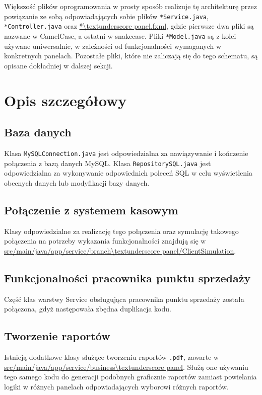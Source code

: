 \documentclass[a4paper,12pt]{article}
\begin{document}
Większość plików oprogramowania w prosty sposób realizuje tę architekturę przez powiązanie ze sobą odpowiadających sobie plików \texttt{*Service.java}, \texttt{*Controller.java} oraz \url{*\textunderscore panel.fxml}, gdzie pierwsze dwa pliki są nazwane w CamelCase, a ostatni w snake\textunderscore{}case.
Pliki \texttt{*Model.java} są z kolei używane uniwersalnie, w zależności od funkcjonalności wymaganych w konkretnych panelach.
Pozostałe pliki, które nie zaliczają się do tego schematu, są opisane dokładniej w dalszej sekcji.

\section{Opis szczegółowy}

\subsection{Baza danych}

Klasa \texttt{MySQLConnection.java} jest odpowiedzialna za nawiązywanie i kończenie połączenia z bazą danych MySQL.
Klasa \texttt{RepositorySQL.java} jest odpowiedzialna za wykonywanie odpowiednich poleceń SQL w celu wyświetlenia obecnych danych lub modyfikacji bazy danych.

\subsection{Połączenie z systemem kasowym}

Klasy odpowiedzialne za realizację tego połączenia oraz symulację takowego połączenia na potrzeby wykazania funkcjonalności znajdują się w \url{src/main/java/app/service/branch\textunderscore panel/ClientSimulation}.

\subsection{Funkcjonalności pracownika punktu sprzedaży}

Część klas warstwy Service obsługująca pracownika punktu sprzedaży została połączona, gdyż następowała zbędna duplikacja kodu.

\subsection{Tworzenie raportów}

Istnieją dodatkowe klasy służące tworzeniu raportów \texttt{.pdf}, zawarte w \url{src/main/java/app/service/business\textunderscore panel}.
Służą one używaniu tego samego kodu do generacji podobnych graficznie raportów zamiast powielania logiki w różnych panelach odpowiadających wyborowi różnych raportów.
\end{document}
